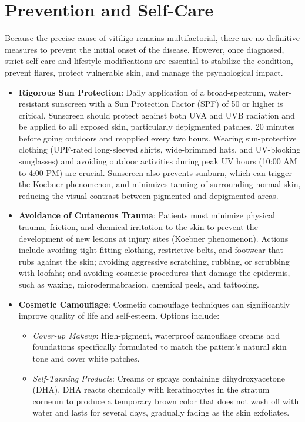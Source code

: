 \section*{Prevention and Self-Care}
Because the precise cause of vitiligo remains multifactorial, there are no definitive measures to prevent the initial onset of the disease. However, once diagnosed, strict self-care and lifestyle modifications are essential to stabilize the condition, prevent flares, protect vulnerable skin, and manage the psychological impact.

\begin{itemize}
    \item \textbf{Rigorous Sun Protection}: Daily application of a broad-spectrum, water-resistant sunscreen with a Sun Protection Factor (SPF) of 50 or higher is critical. Sunscreen should protect against both UVA and UVB radiation and be applied to all exposed skin, particularly depigmented patches, 20 minutes before going outdoors and reapplied every two hours. Wearing sun-protective clothing (UPF-rated long-sleeved shirts, wide-brimmed hats, and UV-blocking sunglasses) and avoiding outdoor activities during peak UV hours (10:00 AM to 4:00 PM) are crucial. Sunscreen also prevents sunburn, which can trigger the Koebner phenomenon, and minimizes tanning of surrounding normal skin, reducing the visual contrast between pigmented and depigmented areas.
    \item \textbf{Avoidance of Cutaneous Trauma}: Patients must minimize physical trauma, friction, and chemical irritation to the skin to prevent the development of new lesions at injury sites (Koebner phenomenon). Actions include avoiding tight-fitting clothing, restrictive belts, and footwear that rubs against the skin; avoiding aggressive scratching, rubbing, or scrubbing with loofahs; and avoiding cosmetic procedures that damage the epidermis, such as waxing, microdermabrasion, chemical peels, and tattooing.
    \item \textbf{Cosmetic Camouflage}: Cosmetic camouflage techniques can significantly improve quality of life and self-esteem. Options include:
    \begin{itemize}
        \item \textit{Cover-up Makeup}: High-pigment, waterproof camouflage creams and foundations specifically formulated to match the patient's natural skin tone and cover white patches.
        \item \textit{Self-Tanning Products}: Creams or sprays containing dihydroxyacetone (DHA). DHA reacts chemically with keratinocytes in the stratum corneum to produce a temporary brown color that does not wash off with water and lasts for several days, gradually fading as the skin exfoliates.

\end{itemize}
\end{itemize}
